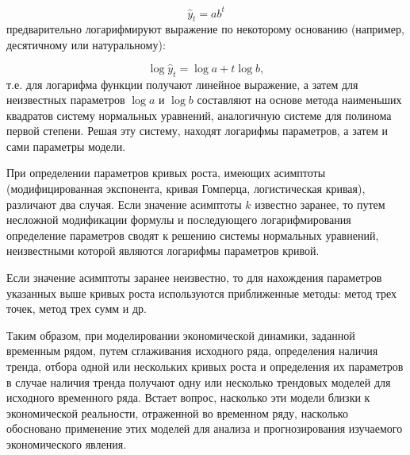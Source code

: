 \[ \hat{y}_t = ab^t \]
предварительно логарифмируют выражение по некоторому основанию (например, десятичному или натуральному):

\[ \log \hat{y}_t = \log a + t \log b, \]
т.е. для логарифма функции получают линейное выражение, а затем для неизвестных параметров $\log a$ и $\log b$ составляют на основе метода наименьших квадратов систему нормальных уравнений, аналогичную системе для полинома первой степени. Решая эту систему, находят логарифмы параметров, а затем и сами параметры модели.

При определении параметров кривых роста, имеющих асимптоты (модифицированная экспонента, кривая Гомперца, логистическая кривая), различают два случая. Если значение асимптоты $ k $ известно заранее, то путем несложной модификации формулы и последующего логарифмирования определение параметров сводят к решению системы нормальных уравнений, неизвестными которой являются логарифмы параметров кривой.

Если значение асимптоты заранее неизвестно, то для нахождения параметров указанных выше кривых роста используются приближенные методы: метод трех точек, метод трех сумм и др.

Таким образом, при моделировании экономической динамики, заданной временным рядом, путем сглаживания исходного ряда, определения наличия тренда, отбора одной или нескольких кривых роста и определения их параметров в случае наличия тренда получают одну или несколько трендовых моделей для исходного временного ряда. Встает вопрос, насколько эти модели близки к экономической реальности, отраженной во временном ряду, насколько обосновано применение этих моделей для анализа и прогнозирования изучаемого экономического явления.


























